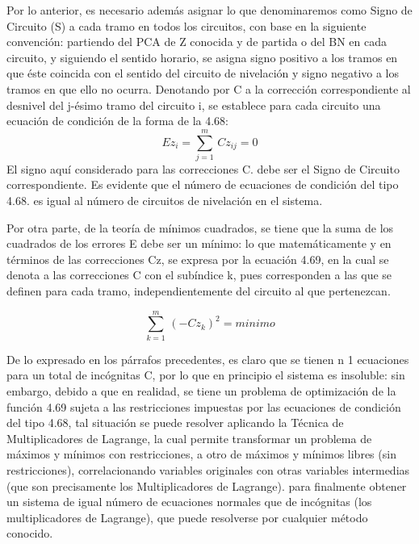 Por lo anterior, es necesario además asignar lo que denominaremos como Signo de Circuito (S) a cada tramo en todos los circuitos, con base en la siguiente convención: partiendo del PCA de Z conocida y de partida o del BN en cada circuito, y siguiendo el sentido horario, se asigna signo positivo a los tramos en que éste coincida con el sentido del circuito de nivelación y signo negativo a los tramos en que ello no ocurra. Denotando por C a la corrección correspondiente al desnivel del j-ésimo tramo del circuito i, se establece para cada circuito una ecuación de condición de la forma de la 4.68:
\begin{equation}
    Ez_i =\sum_{j = 1}^m\,Cz_{ij}= 0
\end{equation}
El signo aquí considerado para las correcciones C. debe ser el Signo de Circuito correspondiente. Es evidente que el número de ecuaciones de condición del tipo 4.68. es igual al número de circuitos de nivelación en el sistema.

Por otra parte, de la teoría de mínimos cuadrados, se tiene que la suma de los cuadrados de los errores E debe ser un mínimo: lo que matemáticamente y en términos de las correcciones Cz, se expresa por la ecuación 4.69, en la cual se denota a las correcciones C con el subíndice k, pues corresponden a las que se definen para cada tramo, independientemente del circuito al que pertenezcan.

\begin{equation}
    \sum_{k = 1}^m\,\left( - Cz_k\right)^2 = minimo
\end{equation}

De lo expresado en los párrafos precedentes, es claro que se tienen n 1 ecuaciones para un total de incógnitas C, por lo que en principio el sistema es insoluble: sin embargo, debido a que en realidad, se tiene un problema de optimización de la función 4.69 sujeta a las restricciones impuestas por las ecuaciones de condición del tipo 4.68, tal situación se puede resolver aplicando la Técnica de Multiplicadores de Lagrange, la cual permite transformar un problema de máximos y mínimos con restricciones, a otro de máximos y mínimos libres (sin restricciones), correlacionando variables originales con otras variables intermedias (que son precisamente los Multiplicadores de Lagrange). para finalmente obtener un sistema de igual número de ecuaciones normales que de incógnitas (los multiplicadores de Lagrange), que puede resolverse por cualquier método conocido.

